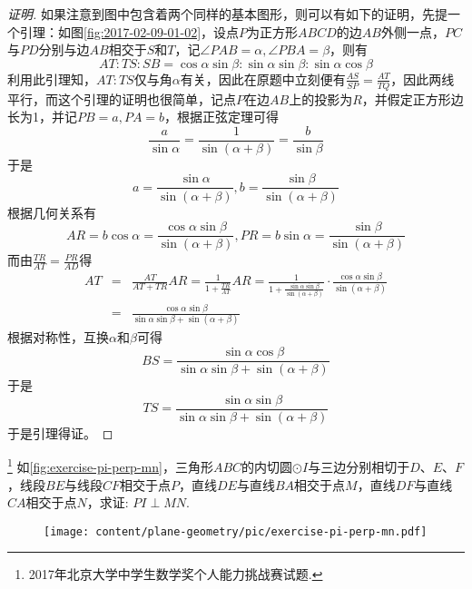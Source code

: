 \begin{proof}[证明]
  如果注意到图中包含着两个同样的基本图形，则可以有如下的证明，先提一个引理：如图\ref{fig:2017-02-09-01-02}，设点$P$为正方形$ABCD$的边$AB$外侧一点，$PC$与$PD$分别与边$AB$相交于$S$和$T$，记$\angle PAB=\alpha, \angle PBA=\beta$，则有
  \begin{equation*}
    AT : TS : SB = \cos{\alpha}\sin{\beta} : \sin{\alpha}\sin{\beta} : \sin{\alpha}\cos{\beta}
  \end{equation*}
  利用此引理知，$AT:TS$仅与角$\alpha$有关，因此在原题中立刻便有$\frac{AS}{SP}=\frac{AT}{TQ}$，因此两线平行，而这个引理的证明也很简单，记点$P$在边$AB$上的投影为$R$，并假定正方形边长为1，并记$PB=a, PA=b$，根据正弦定理可得 
  \begin{equation*}
    \frac{a}{\sin{\alpha}}=\frac{1}{\sin{(\alpha+\beta)}}=\frac{b}{\sin{\beta}}
  \end{equation*}
  于是
  \begin{equation*}
    a=\frac{\sin{\alpha}}{\sin{(\alpha+\beta)}}, b=\frac{\sin{\beta}}{\sin{(\alpha+\beta)}}
  \end{equation*}
  根据几何关系有
  \begin{equation*}
    AR=b\cos{\alpha}=\frac{\cos{\alpha}\sin{\beta}}{\sin{(\alpha+\beta)}}, PR=b\sin{\alpha}=\frac{\sin{\beta}}{\sin{(\alpha+\beta)}}
  \end{equation*}
  而由$\frac{TR}{AT}=\frac{PR}{AD}$得
  \begin{eqnarray*}
    AT &=& \frac{AT}{AT+TR}AR=\frac{1}{1+\frac{TR}{AT}}AR 
    = \frac{1}{1+\frac{\sin{\alpha}\sin{\beta}}{\sin{(\alpha+\beta)}}} \cdot \frac{\cos{\alpha}\sin{\beta}}{\sin{(\alpha+\beta)}} \\
    &=& \frac{\cos{\alpha}\sin{\beta}}{\sin{\alpha}\sin{\beta}+\sin{(\alpha+\beta)}}
  \end{eqnarray*}
  根据对称性，互换$\alpha$和$\beta$可得
  \begin{equation*}
    BS = \frac{\sin{\alpha}\cos{\beta}}{\sin{\alpha}\sin{\beta}+\sin{(\alpha+\beta)}}
  \end{equation*}
  于是
  \begin{equation*}
    TS = \frac{\sin{\alpha}\sin{\beta}}{\sin{\alpha}\sin{\beta}+\sin{(\alpha+\beta)}}
  \end{equation*}
  于是引理得证。
\end{proof}

\begin{exercise}\footnote{2017年北京大学中学生数学奖个人能力挑战赛试题.}
  如\autoref{fig:exercise-pi-perp-mn}，三角形$ABC$的内切圆$\odot I$与三边分别相切于$D$、$E$、$F$，线段$BE$与线段$CF$相交于点$P$，直线$DE$与直线$BA$相交于点$M$，直线$DF$与直线$CA$相交于点$N$，求证: $PI \perp MN$.
 
\begin{figure}[htbp]
  \centering
\texttt{[image: content/plane-geometry/pic/exercise-pi-perp-mn.pdf]}
\caption{}
\label{fig:exercise-pi-perp-mn}
\end{figure}

\end{exercise}

